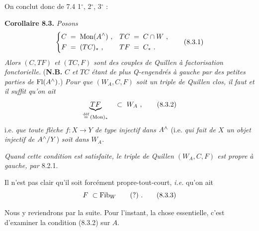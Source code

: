 On conclut donc de 7.4 1$^\circ$, 2$^\circ$, 3$^\circ$ :

\textbf{Corollaire 8.3.} \textit{Posons}
\[
\left\{
\begin{aligned}
C \;&=\; \Mon(A\chap)\ , & TC \;&=\; C\cap W\ ,\\
F \;&=\; (TC)_*\ , & TF \;&=\; C_*\ .
\end{aligned}
\right.
\tag*{(8.3.1)}
\]
\textit{Alors $(C,TF)$ et $(TC,F)$ sont des couples de Quillen à factorisation fonctorielle.} (\textbf{N.B.} \textit{$C$ et $TC$ étant de plus Q-engendrés à gauche par des petites parties de} $\mathrm{Fl}(A^{\wedge})$.) \textit{Pour que $(W_A,C,F)$ soit un triple de Quillen clos, il faut et il suffit qu'on ait}
\[
\underbrace{TF}_{\overset{\text{déf}}{=}\,(\Mon)_*} \quad\subset\ W_A\ ,
\tag*{(8.3.2)}
\]
i.e. \textit{que toute flèche $f:X\longrightarrow Y$ de type injectif dans $A^{\wedge}$} (i.e. \textit{qui fait de $X$ un objet injectif de $A^{\wedge}/Y$}) \textit{soit dans $W_A$.}

\textit{Quand cette condition est satisfaite, le triple de Quillen $(W_A,C,F)$ est propre à gauche, par} 8.2.1.

Il n'est pas clair qu'il soit forcément propre-tout-court, \textit{i.e.} qu'on ait
\[
F\ \subset \Fib_W \qquad (?)\ .
\tag*{(8.3.3)}
\]

Nous y reviendrons par la suite. Pour l'instant, la chose essentielle, c'est d'examiner la condition (8.3.2) sur $A$.

